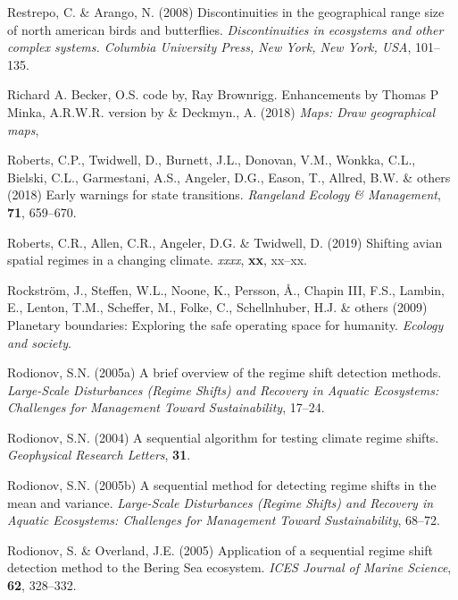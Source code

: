 \documentclass[12pt,twoside,openany]{reedthesis}
\begin{document}
\leavevmode\hypertarget{ref-restrepo2008discontinuities}{}%
Restrepo, C. \& Arango, N. (2008) Discontinuities in the geographical range size of north american birds and butterflies. \emph{Discontinuities in ecosystems and other complex systems. Columbia University Press, New York, New York, USA}, 101--135.

\leavevmode\hypertarget{ref-maps}{}%
Richard A. Becker, O.S. code by, Ray Brownrigg. Enhancements by Thomas P Minka, A.R.W.R. version by \& Deckmyn., A. (2018) \emph{Maps: Draw geographical maps},

\leavevmode\hypertarget{ref-roberts2018early}{}%
Roberts, C.P., Twidwell, D., Burnett, J.L., Donovan, V.M., Wonkka, C.L., Bielski, C.L., Garmestani, A.S., Angeler, D.G., Eason, T., Allred, B.W. \& others (2018) Early warnings for state transitions. \emph{Rangeland Ecology \& Management}, \textbf{71}, 659--670.

\leavevmode\hypertarget{ref-roberts2019shifting}{}%
Roberts, C.R., Allen, C.R., Angeler, D.G. \& Twidwell, D. (2019) Shifting avian spatial regimes in a changing climate. \emph{xxxx}, \textbf{xx}, xx--xx.

\leavevmode\hypertarget{ref-rockstrom_planetary_2009}{}%
Rockström, J., Steffen, W.L., Noone, K., Persson, Å., Chapin III, F.S., Lambin, E., Lenton, T.M., Scheffer, M., Folke, C., Schellnhuber, H.J. \& others (2009) Planetary boundaries: Exploring the safe operating space for humanity. \emph{Ecology and society}.

\leavevmode\hypertarget{ref-rodionov_brief_2005}{}%
Rodionov, S.N. (2005a) A brief overview of the regime shift detection methods. \emph{Large-Scale Disturbances (Regime Shifts) and Recovery in Aquatic Ecosystems: Challenges for Management Toward Sustainability}, 17--24.

\leavevmode\hypertarget{ref-rodionov2004sequential}{}%
Rodionov, S.N. (2004) A sequential algorithm for testing climate regime shifts. \emph{Geophysical Research Letters}, \textbf{31}.

\leavevmode\hypertarget{ref-rodionov_sequential_2005}{}%
Rodionov, S.N. (2005b) A sequential method for detecting regime shifts in the mean and variance. \emph{Large-Scale Disturbances (Regime Shifts) and Recovery in Aquatic Ecosystems: Challenges for Management Toward Sustainability}, 68--72.

\leavevmode\hypertarget{ref-rodionov_application_2005}{}%
Rodionov, S. \& Overland, J.E. (2005) Application of a sequential regime shift detection method to the Bering Sea ecosystem. \emph{ICES Journal of Marine Science}, \textbf{62}, 328--332.
\end{document}
